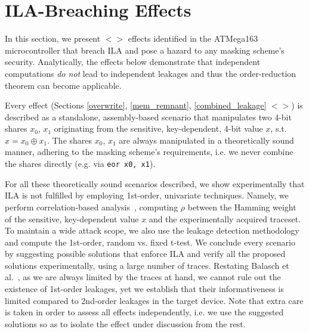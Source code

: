 \section{ILA-Breaching Effects}

In this section, we present $<>$ effects identified in the ATMega163 microcontroller that breach ILA and pose a hazard to any masking scheme's security. Analytically, the effects below demonstrate that independent computations \emph{do not} lead to independent leakages and thus the order-reduction theorem can become applicable.

Every effect (Sections \ref{overwrite}, \ref{mem_remnant}, \ref{combined_leakage} $<>$) is described as a standalone, assembly-based scenario that manipulates two 4-bit shares $x_0$, $x_1$ originating from the sensitive, key-dependent, 4-bit value $x$, s.t. $x=x_0 \oplus x_1$. The shares $x_0$, $x_1$ are always manipulated in a theoretically sound manner, adhering to the masking scheme's requirements, i.e. we never combine the shares directly (e.g. via \texttt{eor x0, x1}). 

For all these theoretically sound scenarios described, we show experimentally that ILA is not fulfilled by employing 1st-order, univariate techniques. Namely, we perform correlation-based analysis~\cite{DBLP:conf/ches/BrierCO04}, computing $\rho$ between the Hamming weight of the sensitive, key-dependent value $x$ and the experimentally acquired traceset. To maintain a wide attack scope, we also use the leakage detection methodology~\cite{tvla,DBLP:conf/ches/SchneiderM15} and compute the 1st-order, random vs. fixed t-test. 
 We conclude every scenario by suggesting possible solutions that enforce ILA and verify all the proposed solutions experimentally, using a large number of traces. Restating Balasch et al.~\cite{DBLP:conf/cardis/BalaschGGRS14}, as we are always limited by the traces at hand, we cannot rule out the existence of 1st-order leakages, yet we establish that their informativeness is limited compared to 2nd-order leakages in the target device. Note that extra care is taken in order to assess all effects independently, i.e. we use the suggested solutions so as to isolate the effect under discussion from the rest.

